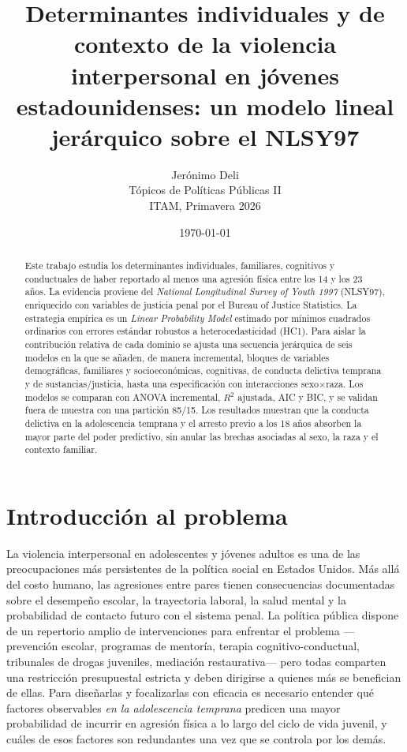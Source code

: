 \documentclass[11pt]{article}
\title{Determinantes individuales y de contexto de la violencia interpersonal en jóvenes estadounidenses: un modelo lineal jerárquico sobre el NLSY97}
\author{Jerónimo Deli\\Tópicos de Políticas Públicas II\\ITAM, Primavera 2026}
\date{\today}
\begin{document}
\maketitle

\begin{abstract}
\noindent Este trabajo estudia los determinantes individuales, familiares, cognitivos y conductuales de haber reportado al menos una agresión física entre los 14 y los 23 años. La evidencia proviene del \textit{National Longitudinal Survey of Youth 1997} (NLSY97), enriquecido con variables de justicia penal por el Bureau of Justice Statistics. La estrategia empírica es un \textit{Linear Probability Model} estimado por mínimos cuadrados ordinarios con errores estándar robustos a heterocedasticidad (HC1). Para aislar la contribución relativa de cada dominio se ajusta una secuencia jerárquica de seis modelos en la que se añaden, de manera incremental, bloques de variables demográficas, familiares y socioeconómicas, cognitivas, de conducta delictiva temprana y de sustancias/justicia, hasta una especificación con interacciones sexo$\times$raza. Los modelos se comparan con ANOVA incremental, $R^2$ ajustada, AIC y BIC, y se validan fuera de muestra con una partición 85/15. Los resultados muestran que la conducta delictiva en la adolescencia temprana y el arresto previo a los 18 años absorben la mayor parte del poder predictivo, sin anular las brechas asociadas al sexo, la raza y el contexto familiar.
\end{abstract}

\newpage
{\setcounter{tocdepth}{2}\tableofcontents}
\newpage

\section{Introducción al problema}

La violencia interpersonal en adolescentes y jóvenes adultos es una de las preocupaciones más persistentes de la política social en Estados Unidos. Más allá del costo humano, las agresiones entre pares tienen consecuencias documentadas sobre el desempeño escolar, la trayectoria laboral, la salud mental y la probabilidad de contacto futuro con el sistema penal. La política pública dispone de un repertorio amplio de intervenciones para enfrentar el problema —prevención escolar, programas de mentoría, terapia cognitivo-conductual, tribunales de drogas juveniles, mediación restaurativa— pero todas comparten una restricción presupuestal estricta y deben dirigirse a quienes más se benefician de ellas. Para diseñarlas y focalizarlas con eficacia es necesario entender qué factores observables \textit{en la adolescencia temprana} predicen una mayor probabilidad de incurrir en agresión física a lo largo del ciclo de vida juvenil, y cuáles de esos factores son redundantes una vez que se controla por los demás.
\end{document}
